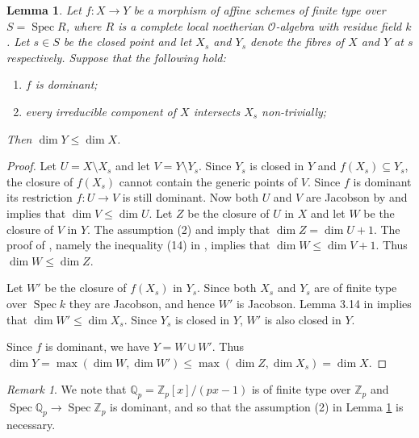 \documentclass{amsart}
\newtheorem{lem}[prop]{Lemma}
\theoremstyle{definition}
\theoremstyle{remark}
\newtheorem{remar}[prop]{Remark}
\DeclareMathOperator{\Spec}{Spec}
\newcommand{\Qp}{\mathbb {Q}_p}
\newcommand{\Zp}{\mathbb{Z}_p}
\newcommand{\OO}{\mathcal O}
\begin{document}
\begin{lem}\label{comm_alg_bacher} Let $f:X\rightarrow Y$ be a morphism of affine schemes of finite type over 
$S=\Spec R$, where $R$ is a complete local noetherian $\OO$-algebra with residue field $k$. Let 
$s\in S$ be the closed point and let $X_s$ and $Y_s$ denote the fibres of $X$ and $Y$ 
at $s$ respectively. Suppose that the following hold:
\begin{enumerate} 
\item $f$ is dominant;
\item every irreducible component of $X$ intersects $X_s$ non-trivially;
\end{enumerate}
Then $\dim Y \le \dim X$. 
\end{lem}
\begin{proof} Let $U= X\setminus X_s$ and let $V=Y\setminus Y_s$. Since $Y_s$ is closed in $Y$
and $f(X_s)\subseteq Y_s$, the closure of $f(X_s)$ cannot contain the generic points 
of $V$. Since $f$ is dominant its restriction  $f:U\rightarrow V$ is still dominant. 
Now both $U$ and $V$ are Jacobson by \cite[Lemma 3.18 (1)]{BIP_new} and \cite[Lemma 3.14]{BIP_new} implies that 
$\dim V \le \dim U$. Let $Z$ be the closure of $U$ in $X$ and let $W$ be the closure of $V$ in 
$Y$. The assumption (2) and \cite[Lemma 3.18 (5)]{BIP_new} imply that $\dim Z = \dim U+1$. 
The proof of \cite[Lemma 3.18 (5)]{BIP_new}, namely the inequality (14) in \cite{BIP_new},  implies that $\dim W\le \dim V+1$. Thus $ \dim W\le \dim Z $. 

Let $W'$ be the closure of $f(X_s)$ in $Y_s$. Since both $X_s$ and $Y_s$ are of finite type
over $\Spec k$ they are Jacobson, and hence $W'$ is Jacobson. Lemma 3.14 in \cite{BIP_new}
implies that $\dim W'\le \dim X_s$. Since $Y_s$ is closed in $Y$, $W'$ is also closed in $Y$. 

Since $f$ is dominant, we have $Y= W\cup W'$. Thus
$\dim Y= \max(\dim W, \dim W')\le \max(\dim Z, \dim X_s)=\dim X.$
\end{proof}

\begin{remar}\label{QpZp} We note that  $\Qp= \Zp[x]/(px-1)$ is 
of finite type over $\Zp$ and $\Spec \Qp \rightarrow \Spec \Zp$ is dominant, and so that the assumption (2) in Lemma \ref{comm_alg_bacher} is necessary. 
\end{remar}
\end{document}
